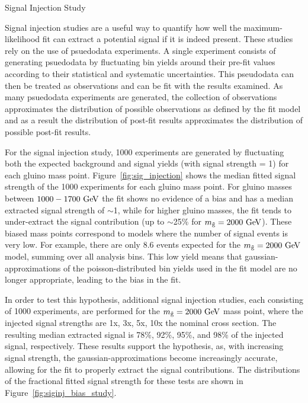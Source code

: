 \begin{subsection}{Signal Injection Study}

Signal injection studies are a useful way to quantify how well the maximum-likelihood fit can extract a potential signal if it is indeed present.
These studies rely on the use of psuedodata experiments.
A single experiment consists of generating psuedodata by fluctuating bin yields around their pre-fit values according to their statistical and systematic uncertainties.
This pseudodata can then be treated as observations and can be fit with the results examined.
As many psuedodata experiments are generated, the collection of observations approximates the distribution of possible observations as defined by the fit model and as a result the distribution of post-fit results approximates the distribution of possible post-fit results.

For the signal injection study, 1000 experiments are generated by fluctuating both the expected background and signal yields (with signal strength = 1) for each gluino mass point.
Figure~\ref{fig:sig_injection} shows the median fitted signal strength of the 1000 experiments for each gluino mass point.
For gluino masses between $1000 - 1700~\mathrm{Ge\kern -0.1em V}$ the fit shows no evidence of a bias and has a median extracted signal strength of $\sim$1, while for higher gluino masses, the fit tends to under-extract the signal contribution (up to $\sim$25\% for $m_{\tilde{\mathrm{g}}} = 2000~\mathrm{Ge\kern -0.1em V}$).
These biased mass points correspond to models where the number of signal events is very low.
For example, there are only 8.6 events expected for the $m_{\tilde{\mathrm{g}}} = 2000~\mathrm{Ge\kern -0.1em V}$ model, summing over all analysis bins.
This low yield means that gaussian-approximations of the poisson-distributed bin yields used in the fit model are no longer appropriate, leading to the bias in the fit.

In order to test this hypothesis, additional signal injection studies, each consisting of 1000 experiments, are performed for the $m_{\tilde{\mathrm{g}}} = 2000~\mathrm{Ge\kern -0.1em V}$ mass point, where the injected signal strengths are 1x, 3x, 5x, 10x the nominal cross section.
The resulting median extracted signal is 78\%, 92\%, 95\%, and 98\% of the injected signal, respectively.
These results support the hypothesis, as, with increasing signal strength, the gaussian-approximations become increasingly accurate, allowing for the fit to properly extract the signal contributions.
The distributions of the fractional fitted signal strength for these tests are shown in Figure~\ref{fig:siginj_bias_study}.


\end{subsection}
